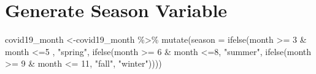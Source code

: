 \documentclass[
]{book}
\newenvironment{Shaded}{\begin{snugshade}}{\end{snugshade}}
\newcommand{\AttributeTok}[1]{\textcolor[rgb]{0.77,0.63,0.00}{#1}}
\newcommand{\DecValTok}[1]{\textcolor[rgb]{0.00,0.00,0.81}{#1}}
\newcommand{\FunctionTok}[1]{\textcolor[rgb]{0.00,0.00,0.00}{#1}}
\newcommand{\NormalTok}[1]{#1}
\newcommand{\OtherTok}[1]{\textcolor[rgb]{0.56,0.35,0.01}{#1}}
\newcommand{\SpecialCharTok}[1]{\textcolor[rgb]{0.00,0.00,0.00}{#1}}
\newcommand{\StringTok}[1]{\textcolor[rgb]{0.31,0.60,0.02}{#1}}
\begin{document}
\begin{Shaded}
\end{Shaded}

\hypertarget{generate-season-variable}{%
\section{Generate Season Variable}\label{generate-season-variable}}

\begin{Shaded}
\begin{Highlighting}[]
\NormalTok{covid19\_month }\OtherTok{\textless{}{-}}\NormalTok{covid19\_month }\SpecialCharTok{\%\textgreater{}\%}
  \FunctionTok{mutate}\NormalTok{(}\AttributeTok{season =} \FunctionTok{ifelse}\NormalTok{(month }\SpecialCharTok{\textgreater{}=} \DecValTok{3} \SpecialCharTok{\&}\NormalTok{ month }\SpecialCharTok{\textless{}=}\DecValTok{5}\NormalTok{ , }\StringTok{"spring"}\NormalTok{, }\FunctionTok{ifelse}\NormalTok{(month }\SpecialCharTok{\textgreater{}=} \DecValTok{6} \SpecialCharTok{\&}\NormalTok{ month }\SpecialCharTok{\textless{}=}\DecValTok{8}\NormalTok{, }\StringTok{"summer"}\NormalTok{, }\FunctionTok{ifelse}\NormalTok{(month }\SpecialCharTok{\textgreater{}=} \DecValTok{9} \SpecialCharTok{\&}\NormalTok{ month }\SpecialCharTok{\textless{}=} \DecValTok{11}\NormalTok{, }\StringTok{"fall"}\NormalTok{, }\StringTok{"winter"}\NormalTok{))))}
\end{Highlighting}
\end{Shaded}
\end{document}
